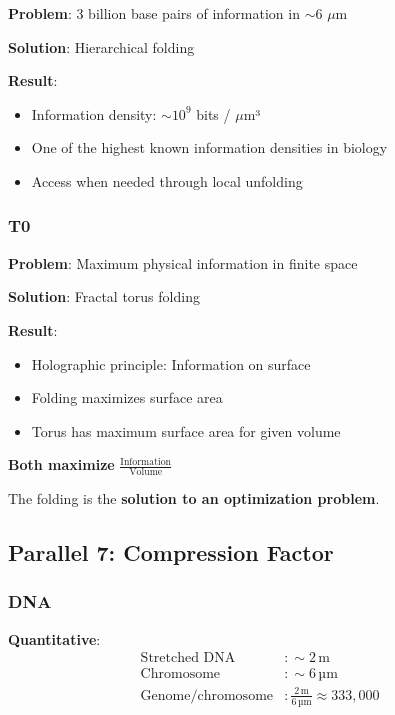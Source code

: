 	\textbf{Problem}: 3 billion base pairs of information in $\sim$6 $\mu$m

	\textbf{Solution}: Hierarchical folding

	\textbf{Result}:
	\begin{itemize}
		\item Information density: $\sim 10^{9}$ bits / $\mu$m³
		\item One of the highest known information densities in biology
		\item Access when needed through local unfolding
	\end{itemize}

	\subsubsection{T0}

	\textbf{Problem}: Maximum physical information in finite space

	\textbf{Solution}: Fractal torus folding

	\textbf{Result}:
	\begin{itemize}
		\item Holographic principle: Information on surface
		\item Folding maximizes surface area
		\item Torus has maximum surface area for given volume
	\end{itemize}

	\begin{keyresult}
		\textbf{Both maximize} $\frac{\text{Information}}{\text{Volume}}$

		The folding is the \textbf{solution to an optimization problem}.
	\end{keyresult}

	\subsection{Parallel 7: Compression Factor}

	\subsubsection{DNA}

	\textbf{Quantitative}:
	\begin{align}
		\text{Stretched DNA} &: \sim 2\,\text{m} \\
		\text{Chromosome} &: \sim 6\,\text{µm} \\
		\text{Genome/chromosome} &: \frac{2\,\text{m}}{6\,\text{µm}} \approx 333,000
	\end{align}

